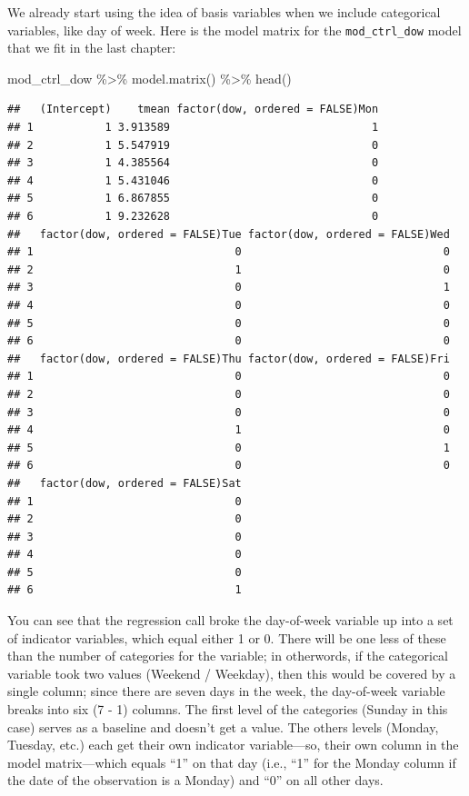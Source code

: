 \documentclass[
]{book}
\newenvironment{Shaded}{\begin{snugshade}}{\end{snugshade}}
\newcommand{\FunctionTok}[1]{\textcolor[rgb]{0.00,0.00,0.00}{#1}}
\newcommand{\NormalTok}[1]{#1}
\newcommand{\SpecialCharTok}[1]{\textcolor[rgb]{0.00,0.00,0.00}{#1}}
\begin{document}
We already start using the idea of basis variables when we include categorical variables, like
day of week. Here is the model matrix for the \texttt{mod\_ctrl\_dow} model that we fit in the last
chapter:

\begin{Shaded}
\begin{Highlighting}[]
\NormalTok{mod\_ctrl\_dow }\SpecialCharTok{\%\textgreater{}\%} 
  \FunctionTok{model.matrix}\NormalTok{() }\SpecialCharTok{\%\textgreater{}\%} 
  \FunctionTok{head}\NormalTok{()}
\end{Highlighting}
\end{Shaded}

\begin{verbatim}
##   (Intercept)    tmean factor(dow, ordered = FALSE)Mon
## 1           1 3.913589                               1
## 2           1 5.547919                               0
## 3           1 4.385564                               0
## 4           1 5.431046                               0
## 5           1 6.867855                               0
## 6           1 9.232628                               0
##   factor(dow, ordered = FALSE)Tue factor(dow, ordered = FALSE)Wed
## 1                               0                               0
## 2                               1                               0
## 3                               0                               1
## 4                               0                               0
## 5                               0                               0
## 6                               0                               0
##   factor(dow, ordered = FALSE)Thu factor(dow, ordered = FALSE)Fri
## 1                               0                               0
## 2                               0                               0
## 3                               0                               0
## 4                               1                               0
## 5                               0                               1
## 6                               0                               0
##   factor(dow, ordered = FALSE)Sat
## 1                               0
## 2                               0
## 3                               0
## 4                               0
## 5                               0
## 6                               1
\end{verbatim}

You can see that the regression call broke the day-of-week variable up into a set of indicator variables, which
equal either 1 or 0. There will be one less of these than the number of categories for the
variable; in otherwords, if the categorical variable took two values (Weekend / Weekday), then
this would be covered by a single column; since there are seven days in the week, the
day-of-week variable breaks into six (7 - 1) columns. The first level of the categories
(Sunday in this case) serves as a baseline and doesn't get a value. The others levels
(Monday, Tuesday, etc.) each get their own indicator variable---so, their own column in
the model matrix---which equals ``1'' on that day (i.e., ``1'' for the Monday column if the date
of the observation is a Monday) and ``0'' on all other days.
\end{document}
